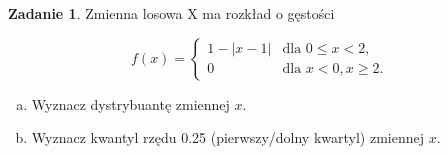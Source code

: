 \documentclass[11pt]{article}
\theoremstyle{definition}
\newtheorem{zadanie}{Zadanie}
\numberwithin{zadanie}{section}
\begin{document}
\begin{zadanie}
    Zmienna losowa X ma rozkład o gęstości

    \[
        f(x) = \left\{\begin{array}{lr}
            1-|x-1| & \text{dla } 0\leq x < 2,  \\
            0       & \text{dla } x<0, x\geq 2.
        \end{array}\right.
    \]

    \begin{enumerate}[a)]
        \item Wyznacz dystrybuantę zmiennej $x$.
        \item Wyznacz kwantyl rzędu 0.25 (pierwszy/dolny kwartyl) zmiennej $x$.
    \end{enumerate}
\end{zadanie}
\end{document}
